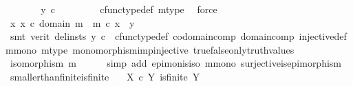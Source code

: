 \begin{isabellebody}
\ \ \ \ \isamarkupfalse%
\ \isamarkupfalse%
\ {\isachardoublequoteopen}y\ {\isasymin}\isactrlsub c\ {\isasymOmega}{\isachardoublequoteclose}\isanewline
\ \ \ \ \ \ \isamarkupfalse%
\ cfunc{\isacharunderscore}{\kern0pt}type{\isacharunderscore}{\kern0pt}def\ m{\isacharunderscore}{\kern0pt}type\ \isamarkupfalse%
\ force\isanewline
\ \ \ \ \isamarkupfalse%
\ {\isachardoublequoteopen}{\isasymexists}x{\isachardot}{\kern0pt}\ x\ {\isasymin}\isactrlsub c\ domain\ m\ {\isasymand}\ m\ {\isasymcirc}\isactrlsub c\ x\ {\isacharequal}{\kern0pt}\ y{\isachardoublequoteclose}\isanewline
\ \ \ \ \ \ \isamarkupfalse%
\ {\isacharparenleft}{\kern0pt}smt\ {\isacharparenleft}{\kern0pt}verit{\isacharcomma}{\kern0pt}\ del{\isacharunderscore}{\kern0pt}insts{\isacharparenright}{\kern0pt}\ {\isacartoucheopen}y\ {\isasymin}\isactrlsub c\ {\isasymOmega}{\isacartoucheclose}\ cfunc{\isacharunderscore}{\kern0pt}type{\isacharunderscore}{\kern0pt}def\ codomain{\isacharunderscore}{\kern0pt}comp\ domain{\isacharunderscore}{\kern0pt}comp\ injective{\isacharunderscore}{\kern0pt}def\ m{\isacharunderscore}{\kern0pt}mono\ m{\isacharunderscore}{\kern0pt}type\ monomorphism{\isacharunderscore}{\kern0pt}imp{\isacharunderscore}{\kern0pt}injective\ true{\isacharunderscore}{\kern0pt}false{\isacharunderscore}{\kern0pt}only{\isacharunderscore}{\kern0pt}truth{\isacharunderscore}{\kern0pt}values{\isacharparenright}{\kern0pt}\isanewline
\ \ \isamarkupfalse%
\isanewline
\ \ \isamarkupfalse%
\ \isamarkupfalse%
\ {\isachardoublequoteopen}isomorphism\ m{\isachardoublequoteclose}\isanewline
\ \ \ \ \isamarkupfalse%
\ {\isacharparenleft}{\kern0pt}simp\ add{\isacharcolon}{\kern0pt}\ epi{\isacharunderscore}{\kern0pt}mon{\isacharunderscore}{\kern0pt}is{\isacharunderscore}{\kern0pt}iso\ m{\isacharunderscore}{\kern0pt}mono\ surjective{\isacharunderscore}{\kern0pt}is{\isacharunderscore}{\kern0pt}epimorphism{\isacharparenright}{\kern0pt}\isanewline
{}\isamarkupfalse%
%
\endisatagproof
{\isafoldproof}%
%
\isadelimproof
\isanewline
%
\endisadelimproof
\isanewline
{}\isamarkupfalse%
\ smaller{\isacharunderscore}{\kern0pt}than{\isacharunderscore}{\kern0pt}finite{\isacharunderscore}{\kern0pt}is{\isacharunderscore}{\kern0pt}finite{\isacharcolon}{\kern0pt}\isanewline
\ \ \ {\isachardoublequoteopen}X\ {\isasymle}\isactrlsub c\ Y{\isachardoublequoteclose}\ {\isachardoublequoteopen}is{\isacharunderscore}{\kern0pt}finite\ Y{\isachardoublequoteclose}\ \isanewline

\end{isabellebody}
